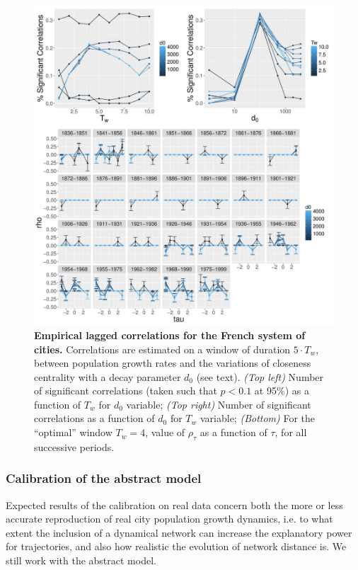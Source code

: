 \documentclass[11pt]{article}
\begin{document}
\begin{figure}
	\includegraphics[width=\linewidth]{figures/Fig5.jpg}
	\caption[Empirical lagged correlations for the French system of cities]{\textbf{Empirical lagged correlations for the French system of cities.} Correlations are estimated on a window of duration $5\cdot T_w$, between population growth rates and the variations of closeness centrality with a decay parameter $d_0$ (see text). \textit{(Top left)} Number of significant correlations (taken such that $p<0.1$ at 95\%) as a function of $T_w$ for $d_0$ variable; \textit{(Top right)} Number of significant correlations as a function of $d_0$ for $T_w$ variable; \textit{(Bottom)} For the ``optimal'' window $T_w = 4$, value of $\rho_{\tau}$ as a function of $\tau$, for all successive periods.\label{fig:macrocoevol:empirical}}
\end{figure}


\subsubsection{Calibration of the abstract model}


Expected results of the calibration on real data concern both the more or less accurate reproduction of real city population growth dynamics, i.e. to what extent the inclusion of a dynamical network can increase the explanatory power for trajectories, and also how realistic the evolution of network distance is. We still work with the abstract model.
\end{document}
